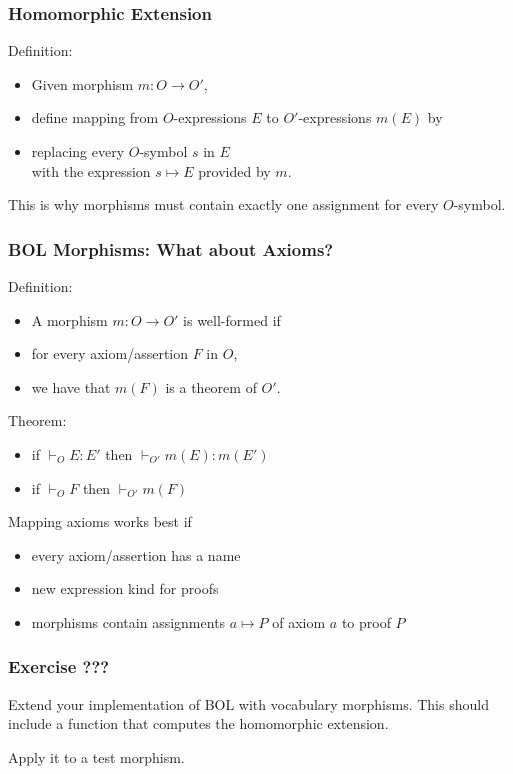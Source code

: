 \begin{frame}\frametitle{Homomorphic Extension}
Definition:
\begin{itemize}
\item Given morphism $m:O\to O'$,
\item define mapping from $O$-expressions $E$ to $O'$-expressions $m(E)$ by
\item replacing every $O$-symbol $s$ in $E$ \\ with the expression $s\mapsto E$ provided by $m$.
\end{itemize}

This is why morphisms must contain exactly one assignment for every $O$-symbol.
\end{frame}

\begin{frame}\frametitle{BOL Morphisms: What about Axioms?}
Definition:
\begin{itemize}
\item A morphism $m:O\to O'$ is well-formed if
\item for every axiom/assertion $F$ in $O$,
\item we have that $m(F)$ is a theorem of $O'$.
\end{itemize}

Theorem:
\begin{itemize}
\item if $\vdash_O E:E'$ then $\vdash_{O'} m(E):m(E')$
\item if $\vdash_O F$ then $\vdash_{O'} m(F)$
\end{itemize}

Mapping axioms works best if
\begin{itemize}
\item every axiom/assertion has a name
\item new expression kind for proofs 
\item morphisms contain assignments $a\mapsto P$ of axiom $a$ to proof $P$
\end{itemize}
\end{frame}

\begin{frame}\frametitle{Exercise ???}
Extend your implementation of BOL with vocabulary morphisms.
This should include a function that computes the homomorphic extension.

Apply it to a test morphism.
\end{frame}

